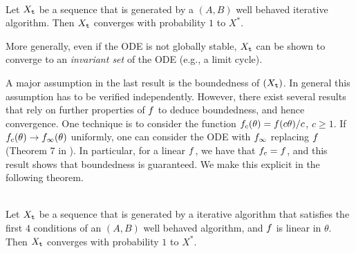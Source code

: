 \begin{theorem}\ \\
\label{thm:stoch-approx-ODE}
Let $X_{\tt t}$ be a sequence that is generated by a
$(A,B)$ well behaved iterative algorithm. Then $X_{\tt t}$
converges with probability $1$ to $X^*$.
\end{theorem}



\begin{remark}
More generally, even if the ODE is not globally stable, $X_{\tt t}$ can be shown to converge
to an {\em invariant set} of the ODE (e.g., a limit cycle).
\end{remark}
\begin{remark}
A major assumption in the last result is the boundedness of $(X_{\tt t})$.
In general this assumption has to be verified independently. However, there
exist several results that rely on further properties of $f$ to deduce
boundedness, and hence convergence. One technique is to consider the function $f_c(\theta) = f(c \theta) / c$, $c\geq 1$. If $f_c(\theta) \to f_\infty(\theta)$ uniformly, one can consider the ODE with $f_\infty$ replacing $f$ (Theorem 7 in \cite{borkar2009stochastic}). In particular, for a linear $f$, we have that $f_c = f$, and this result shows that boundedness is guaranteed. We make this explicit in the following theorem.
\begin{theorem}\ \\
\label{thm:stoch-approx-ODE-linear}
 Let $X_{\tt t}$ be a sequence that is generated by a
iterative algorithm that satisfies the first $4$ conditions of an $(A,B)$ well behaved algorithm, and $f$ is linear in $\theta$. Then $X_{\tt t}$
converges with probability $1$ to $X^*$.
\end{theorem}
\end{remark}
